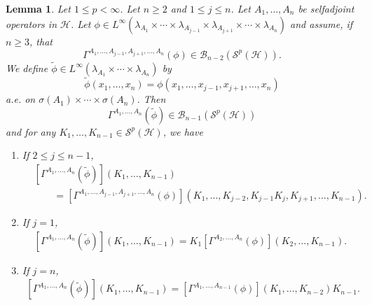 \documentclass[12pt]{amsart}
\newtheorem{lemma}[theorem]{Lemma}
\theoremstyle{remark}
\begin{document}
\begin{lemma}\label{simplification2}
Let $1 \leq p < \infty$. Let $n \geq 2$ and $1\leq j \leq n$. Let $A_1, \ldots, A_n$ be selfadjoint operators in $\mathcal{H}$. Let $\phi \in L^{\infty}(\lambda_{A_1} \times \cdots \times \lambda_{A_{j-1}} \times \lambda_{A_{j+1}} \times \cdots \times \lambda_{A_n})$ and assume, if $n\geq 3$, that
$$
\Gamma^{A_1, \ldots, A_{j-1}, A_{j+1}, \ldots, A_n}(\phi) \in \mathcal{B}_{n-2}(\mathcal{S}^p(\mathcal{H})).
$$
We define $\widetilde{\phi} \in L^{\infty}(\lambda_{A_1} \times \cdots \times \lambda_{A_n})$ by
\begin{equation}\label{fortilde2}
\widetilde{\phi}(x_1, \ldots, x_n) = \phi(x_1, \ldots, x_{j-1}, x_{j+1}, \ldots, x_n)
\end{equation}
a.e. on $\sigma(A_1) \times \cdots \times \sigma(A_n)$. Then
$$
\Gamma^{A_1, \ldots, A_n}(\widetilde{\phi}) \in \mathcal{B}_{n-1}(\mathcal{S}^p(\mathcal{H}))
$$
and for any $K_1, \ldots, K_{n-1} \in \mathcal{S}^p(\mathcal{H})$, we have
\begin{enumerate}
\item[(i)] If $2\leq j \leq n-1$,
\begin{align*}
& \left[ \Gamma^{A_1, \ldots, A_n}(\widetilde{\phi})\right] (K_1, \ldots, K_{n-1}) \\
& \ \ \ \ \ \ \ \ \ = \left[ \Gamma^{A_1, \ldots, A_{j-1}, A_{j+1}, \ldots, A_n}(\phi)\right] \left(K_1, \ldots, K_{j-2}, K_{j-1}K_j, K_{j+1}, \ldots, K_{n-1}\right).
\end{align*}
\item[(ii)] If $j=1$,
\begin{align*}
\left[ \Gamma^{A_1, \ldots, A_n}(\widetilde{\phi})\right] (K_1, \ldots, K_{n-1}) = K_1\left[ \Gamma^{A_2, \ldots, A_n}(\phi)\right] \left(K_2, \ldots, K_{n-1}\right).
\end{align*}
\item[(iii)] If $j=n$,
\begin{align*}
\left[ \Gamma^{A_1, \ldots, A_n}(\widetilde{\phi})\right] (K_1, \ldots, K_{n-1}) = \left[ \Gamma^{A_1, \ldots, A_{n-1}}(\phi)\right] \left(K_1, \ldots, K_{n-2}\right) K_{n-1}.
\end{align*}
\end{enumerate}
\end{lemma}
\end{document}
